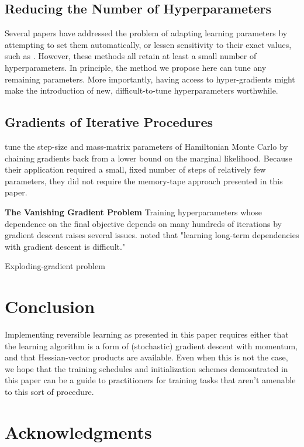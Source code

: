 \documentclass{article}
\begin{document}
\subsection{Reducing the Number of Hyperparameters}
Several papers have addressed the problem of adapting learning parameters by attempting to set them automatically, or lessen sensitivity to their exact values, such as \cite{schaul2012no, Adam14, Adasecant14, Hotswap14}.
However, these methods all retain at least a small number of hyperparameters.
In principle, the method we propose here can tune any remaining parameters.
More importantly, having access to hyper-gradients might make the introduction of new, difficult-to-tune hyperparameters worthwhile.

\subsection{Gradients of Iterative Procedures}

\citet{Bridging14} tune the step-size and mass-matrix parameters of Hamiltonian Monte Carlo by chaining gradients back from a lower bound on the marginal likelihood.
Because their application required a small, fixed number of steps of relatively few parameters, they did not require the memory-tape approach presented in this paper.

\textbf{The Vanishing Gradient Problem}
Training hyperparameters whose dependence on the final objective depends on many hundreds of iterations by gradient descent raises several issues.
\citet{bengio1994learning} noted that "learning long-term dependencies with gradient descent is difficult."

Exploding-gradient problem~\cite{pascanu2012understanding}


\section{Conclusion}

Implementing reversible learning as presented in this paper requires either that the learning algorithm is a form of (stochastic) gradient descent with momentum, and that Hessian-vector products are available.
Even when this is not the case, we hope that the training schedules and initialization schemes demosntrated in this paper can be a guide to practitioners for training tasks that aren't amenable to this sort of procedure.

\section*{Acknowledgments} 




\end{document}
